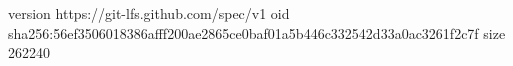 version https://git-lfs.github.com/spec/v1
oid sha256:56ef3506018386afff200ae2865ce0baf01a5b446c332542d33a0ac3261f2c7f
size 262240
